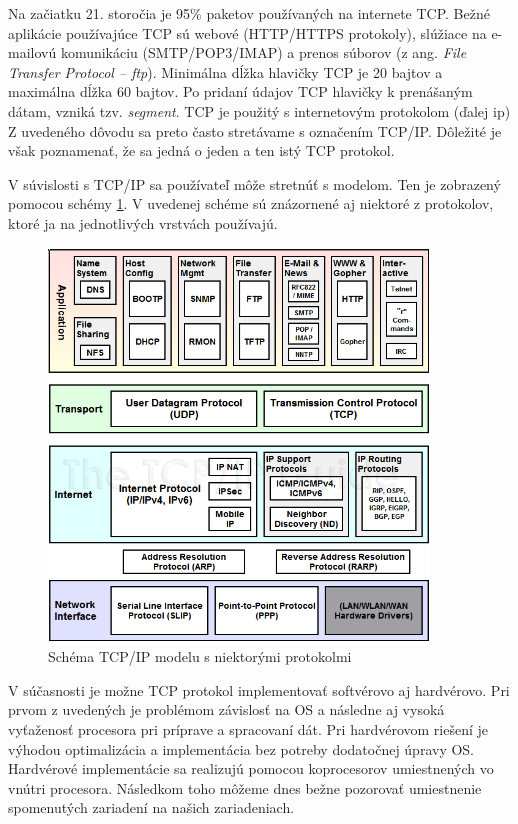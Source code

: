 Na začiatku 21. storočia je 95\% paketov používaných na internete TCP. Bežné aplikácie používajúce TCP sú webové (HTTP/HTTPS protokoly), slúžiace na e-mailovú komunikáciu (SMTP/POP3/IMAP) a prenos súborov (z ang. \textit{File Transfer Protocol -- \acrshort{ftp}}). Minimálna dĺžka hlavičky TCP je 20 bajtov a maximálna dĺžka 60 bajtov. Po pridaní údajov TCP hlavičky k prenášaným dátam, vzniká tzv. \textit{segment}. TCP je použitý s internetovým protokolom (ďalej \acrshort{ip}) Z uvedeného dôvodu sa preto často stretávame s označením TCP/IP. Dôležité je však poznamenať, že sa jedná o jeden a ten istý TCP protokol. 

V súvislosti s TCP/IP sa používateľ môže stretnúť s modelom. Ten je zobrazený pomocou schémy \ref{tcpipprot}. V uvedenej schéme sú znázornené aj niektoré z protokolov, ktoré ja na jednotlivých vrstvách používajú.

\begin{figure}[!ht]
	\centering
	\includegraphics[width=0.9\textwidth]{figures/tcpipprot}
	\caption{Schéma TCP/IP modelu s niektorými protokolmi}
	\label{tcpipprot}
\end{figure}

V súčasnosti je možne TCP protokol implementovať softvérovo aj hardvérovo. Pri prvom z uvedených je problémom závislosť na OS a následne aj vysoká vyťaženosť procesora pri príprave a spracovaní dát. Pri hardvérovom riešení je výhodou optimalizácia a implementácia bez potreby dodatočnej úpravy OS. Hardvérové implementácie sa realizujú pomocou koprocesorov umiestnených vo vnútri procesora. Následkom toho môžeme dnes bežne pozorovať umiestnenie spomenutých zariadení na našich zariadeniach.

